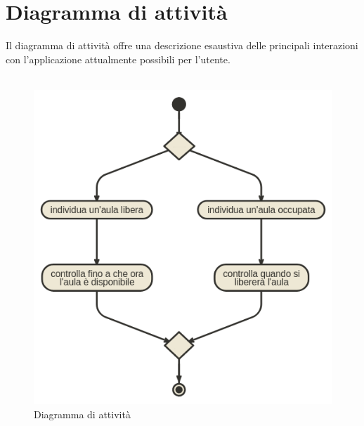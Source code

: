 \documentclass{article}
\begin{document}
	\section{Diagramma di attività}
	Il diagramma di attività offre una descrizione esaustiva delle principali interazioni con l'applicazione attualmente possibili per l'utente.\\\\
	\begin{figure}[h]
		\includegraphics[width=\textwidth]{attivita}
		\centering
		\caption{Diagramma di attività}
	\end{figure}
	\newpage
\end{document}
